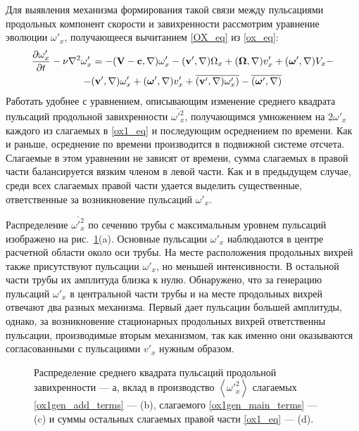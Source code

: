 Для выявления механизма формирования такой связи между пульсациями продольных компонент скорости и завихренности рассмотрим уравнение эволюции $\omega'_x$, получающееся вычитанием \eqref{OX_eq} из \eqref{ox_eq}:
\begin{multline}\label{ox1_eq}
\frac{\partial \omega'_x}{\partial t} - \nu \nabla^2 \omega'_x = - (\mathbf{V} - \mathbf{c}, \nabla) \omega'_x - (\mathbf{v}', \nabla) \Omega_x
+(\mbox{\boldmath$\Omega$}, \nabla) v'_x + (\mbox{\boldmath$\omega$}', \nabla) V_x -\\- (\mathbf{v}', \nabla) \omega'_x  + (\mbox{\boldmath$\omega$}', \nabla) v'_x  + \overline{(\mathbf{v}', \nabla) \omega'_x)}  - \overline{(\mbox{\boldmath$\omega$}', \nabla)}
\end{multline}
Работать удобнее с уравнением, описывающим изменение среднего квадрата пульсаций продольной завихренности $\overline{\omega'^2_x}$, получающимся умножением на $2\omega'_x$ каждого из слагаемых в \eqref{ox1_eq} и последующим осреднением по времени. Как и раньше, осреднение по времени производится в подвижной системе отсчета. Слагаемые в этом уравнении не зависят от времени, сумма слагаемых в правой части балансируется вязким членом в левой части. Как и в предыдущем случае, среди всех слагаемых правой части удается выделить существенные, ответственные за возникновение пульсаций $\omega'_x$.


Распределение $\overline{\omega'^2_x}$ по сечению трубы с максимальным уровнем пульсаций изображено на рис.~\ref{ox1gen_pic}(a). Основные пульсации $\omega'_x$ наблюдаются в центре расчетной области около оси трубы. На месте расположения продольных вихрей также присутствуют пульсации $\omega'_x$, но меньшей интенсивности. В остальной части трубы их амплитуда близка к нулю. Обнаружено, что за генерацию пульсаций $\omega'_x$ в центральной части трубы и на месте продольных вихрей отвечают два разных механизма. Первый дает пульсации большей амплитуды, однако, за возникновение стационарных продольных вихрей ответственны пульсации, производимые вторым механизмом, так как именно они оказываются согласованными с пульсациями $v'_x$ нужным образом.


\begin{figure}[h]
\caption{Распределение среднего квадрата пульсаций продольной завихренности --- а, вклад в производство $\left<\omega'^2_x \right>$ слагаемых \eqref{ox1gen_add_terms} --- (b), слагаемого \eqref{ox1gen_main_terms} --- (c) и суммы остальных слагаемых правой части \eqref{ox1_eq} --- (d).}
\label{ox1gen_pic}
\end{figure}


